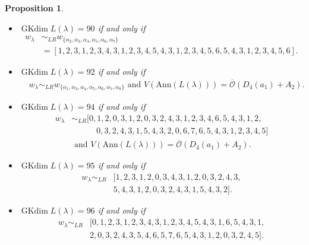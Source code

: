 \documentclass[reqno,12pt]{amsart}
\numberwithin{equation}{section}
\theoremstyle{plain}
\newtheorem{Prop}[Thm]{Proposition}
\theoremstyle{definition}
\newcommand{\lam}{\lambda}
\newcommand{\Ann}{\mathrm{Ann}}
\newcommand{\gkd}{\operatorname{GKdim}}
\begin{document}
\begin{Prop}
\begin{itemize}
     

  

\item[(15)] $\gkd L(\lambda)=90$ if and only if \begin{align*}
           w_{\lambda}&\sim_{LR}w_{\{\alpha_2,\alpha_3,\alpha_4,\alpha_5,\alpha_6,\alpha_7\}}\\  &=[1, 2, 3, 1, 2, 3, 4, 3, 1, 2, 3, 4, 5, 4, 3, 1, 2, 3, 4, 5, 6, 5, 4, 3, 1, 2, 3, 4, 5, 6]. 
      \end{align*}
\item[(16)] $\gkd L(\lambda)=92$ if and only if \begin{align*}
          &w_{\lambda}\sim_{LR}w_{\{\alpha_1,\alpha_3,\alpha_4,\alpha_5,\alpha_6,\alpha_7,\alpha_8\}} \text{~and~} V(\Ann (L(\lam)))=\overline{\mathcal{O}}({D}_4(a_1)+A_2).
      \end{align*}
  
      
\item[(17)] $\gkd L(\lambda)=94$ if and only if \begin{align*}
          w_{\lambda}&\sim_{LR}   
      [0, 1, 2, 0, 3, 1, 2, 0, 3, 2, 4, 3, 1, 2, 3, 4, 6, 5, 4, 3, 1, 2,\\
      &\quad \quad \quad  0, 3, 2, 4, 3, 1, 5, 4, 3, 2, 0, 6, 7, 6, 5, 4, 3, 1, 2, 3, 4, 5]\\
    &\text{~and~}  V(\Ann (L(\lam)))=\overline{\mathcal{O}}({D}_4(a_1)+A_2).
\end{align*}



\item[(18)] $\gkd L(\lambda)=95$ if and only if \begin{align*}
    w_{\lambda}\sim_{LR}&[1, 2, 3, 1, 2, 0, 3, 4, 3, 1, 2, 0, 3, 2, 4,3,\\
    & 5, 4, 3, 1, 2, 0, 3, 2, 4, 3, 1, 5,4,3,2].
\end{align*}



\item[(19)] $\gkd L(\lambda)=96$ if and only if \begin{align*}
          w_{\lambda}\sim_{LR} &  
      [0, 1, 2, 3, 1, 2, 3, 4, 3, 1, 2, 3, 4, 5, 4, 3, 1, 6, 5, 4, 3, 1,\\& 2, 0, 3, 2, 4, 3, 5, 4, 6, 5, 7, 6, 5, 4, 3, 1, 2, 0, 3, 2, 4, 5].
\end{align*}




\end{itemize}
\end{Prop}
\end{document}
